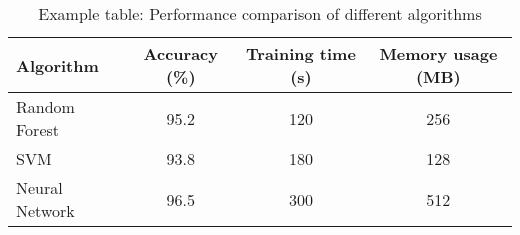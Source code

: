 \begin{table}[htbp]
    \centering
    \caption{Example table: Performance comparison of different algorithms}
    \label{tab:algorithm-comparison}
    \begin{tabular}{lccc}
        \toprule
        Algorithm & Accuracy (\%) & Training time (s) & Memory usage (MB) \\
        \midrule
        Random Forest & 95.2 & 120 & 256 \\
        SVM & 93.8 & 180 & 128 \\
        Neural Network & 96.5 & 300 & 512 \\
        \bottomrule
    \end{tabular}
\end{table}